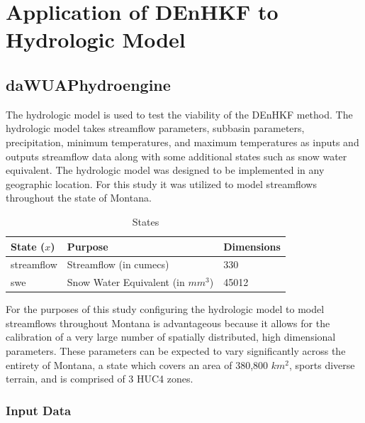 \chapter{Application of DEnHKF to Hydrologic Model}

\section{daWUAPhydroengine}

The hydrologic model is used to test the viability of the DEnHKF method. The hydrologic model takes streamflow parameters, subbasin parameters, precipitation, minimum temperatures, and maximum temperatures as inputs and outputs streamflow data along with some additional states such as snow water equivalent. The hydrologic model was designed to be implemented in any geographic location. For this study it was utilized to model streamflows throughout the state of Montana.

\begin{table}[]
\caption{States} 
\begin{tabular}{lll}
State ($x$) & Purpose                              & Dimensions  \\ \hline
streamflow  & Streamflow (in cumecs)               & 330   \\
swe         & Snow Water Equivalent  (in $mm^{3}$) & 45012
\end{tabular}
\label{tab:states}
\end{table}

For the purposes of this study configuring the hydrologic model to model streamflows throughout Montana is advantageous because it allows for the calibration of a very large number of spatially distributed, high dimensional parameters. These parameters can be expected to vary significantly across the entirety of Montana, a state which covers an area of 380,800 $km^{2}$, sports diverse terrain, and is comprised of 3 HUC4 zones.

\subsection{Input Data}


